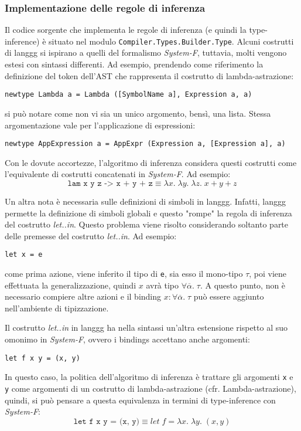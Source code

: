 \documentclass[10pt,a4paper]{article}
\begin{document}
\subsubsection{Implementazione delle regole di inferenza}
Il codice sorgente che implementa le regole di inferenza (e quindi la type-inference) è situato nel modulo
\texttt{Compiler.Types.Builder.Type}. Alcuni costrutti di langgg si ispirano a quelli del formalismo \textit{System-F},
tuttavia, molti vengono estesi con sintassi differenti. Ad esempio, prendendo come riferimento la definizione del token
dell'AST che rappresenta il costrutto di lambda-astrazione:
\begin{lstlisting}
newtype Lambda a = Lambda ([SymbolName a], Expression a, a)
\end{lstlisting}
si può notare come non vi sia un unico argomento, bensì, una lista. Stessa argomentazione vale per l'applicazione
di espressioni:
\begin{lstlisting}
newtype AppExpression a = AppExpr (Expression a, [Expression a], a)
\end{lstlisting}
Con le dovute accortezze, l'algoritmo di inferenza considera questi costrutti come l'equivalente di costrutti
concatenati in \textit{System-F}. Ad esempio:
\[ \texttt{lam x y z -> x + y + z} \equiv \lambda x. \; \lambda y. \; \lambda z. \; x + y + z \]

Un altra nota è necessaria sulle definizioni di simboli in langgg. Infatti, langgg permette la definizione di simboli
globali e questo "rompe" la regola di inferenza del costrutto \textit{let..in}. Questo problema viene risolto
considerando soltanto parte delle premesse del costrutto \textit{let..in}. Ad esempio:
\begin{lstlisting}
let x = e
\end{lstlisting}
come prima azione, viene inferito il tipo di \texttt{e}, sia esso il mono-tipo $ \tau $, poi viene effettuata la
generalizzazione, quindi $ x $ avrà tipo $ \forall \overline{\alpha}. \; \tau $. A questo punto, non è necessario
compiere altre azioni e il binding $ x : \forall \overline{\alpha}. \; \tau $ può essere aggiunto nell'ambiente di
tipizzazione.

Il costrutto \textit{let..in} in langgg ha nella sintassi un'altra estensione rispetto al suo omonimo in \textit{System-F},
ovvero i bindings accettano anche argomenti:
\begin{lstlisting}
let f x y = (x, y)
\end{lstlisting}
In questo caso, la politica dell'algoritmo di inferenza è trattare gli argomenti \texttt{x} e \texttt{y} come argomenti
di un costrutto di lambda-astrazione (cfr. Lambda-astrazione), quindi, si può pensare a questa equivalenza in termini
di type-inference con \textit{System-F}:
\[ \texttt{let f x y = (x, y)} \equiv let \; f = \lambda x. \; \lambda y. \; (x, y) \]
\end{document}

